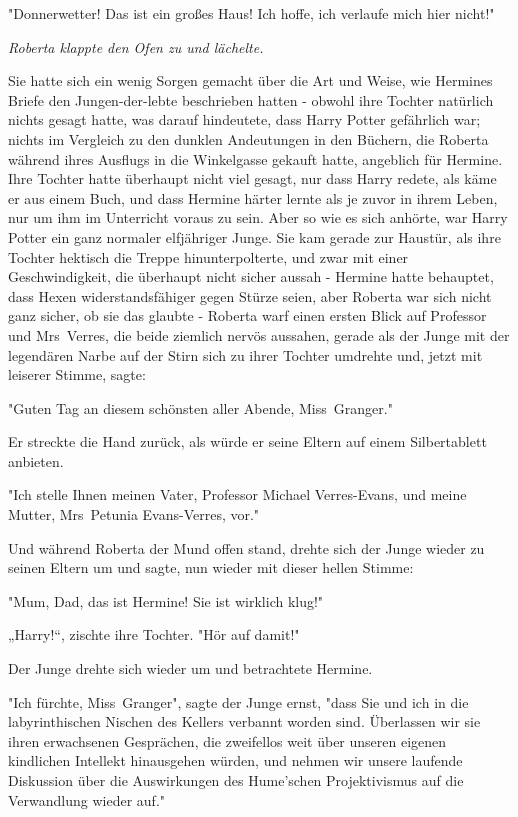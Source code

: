 {"Donnerwetter! Das ist ein großes Haus! Ich hoffe, ich verlaufe mich hier nicht!"

\emph{Roberta klappte den Ofen zu und lächelte.}

Sie hatte sich ein wenig Sorgen gemacht über die Art und Weise, wie Hermines Briefe den Jungen-der-lebte beschrieben hatten - obwohl ihre Tochter natürlich nichts gesagt hatte, was darauf hindeutete, dass Harry Potter gefährlich war; nichts im Vergleich zu den dunklen Andeutungen in den Büchern, die Roberta während ihres Ausflugs in die Winkelgasse gekauft hatte, angeblich für Hermine. Ihre Tochter hatte überhaupt nicht viel gesagt, nur dass Harry redete, als käme er aus einem Buch, und dass Hermine härter lernte als je zuvor in ihrem Leben, nur um ihm im Unterricht voraus zu sein. Aber so wie es sich anhörte, war Harry Potter ein ganz normaler elfjähriger Junge. Sie kam gerade zur Haustür, als ihre Tochter hektisch die Treppe hinunterpolterte, und zwar mit einer Geschwindigkeit, die überhaupt nicht sicher aussah - Hermine hatte behauptet, dass Hexen widerstandsfähiger gegen Stürze seien, aber Roberta war sich nicht ganz sicher, ob sie das glaubte - Roberta warf einen ersten Blick auf Professor und Mrs~Verres, die beide ziemlich nervös aussahen, gerade als der Junge mit der legendären Narbe auf der Stirn sich zu ihrer Tochter umdrehte und, jetzt mit leiserer Stimme, sagte:

"Guten Tag an diesem schönsten aller Abende, Miss~Granger."

Er streckte die Hand zurück, als würde er seine Eltern auf einem Silbertablett anbieten.

"Ich stelle Ihnen meinen Vater, Professor Michael Verres-Evans, und meine Mutter, Mrs~Petunia Evans-Verres, vor."

Und während Roberta der Mund offen stand, drehte sich der Junge wieder zu seinen Eltern um und sagte, nun wieder mit dieser hellen Stimme:

"Mum, Dad, das ist Hermine! Sie ist wirklich klug!"

„Harry!“, zischte ihre Tochter. "Hör auf damit!"

Der Junge drehte sich wieder um und betrachtete Hermine.

"Ich fürchte, Miss~Granger", sagte der Junge ernst, "dass Sie und ich in die labyrinthischen Nischen des Kellers verbannt worden sind. Überlassen wir sie ihren erwachsenen Gesprächen, die zweifellos weit über unseren eigenen kindlichen Intellekt hinausgehen würden, und nehmen wir unsere laufende Diskussion über die Auswirkungen des Hume'schen Projektivismus auf die Verwandlung wieder auf."

}
